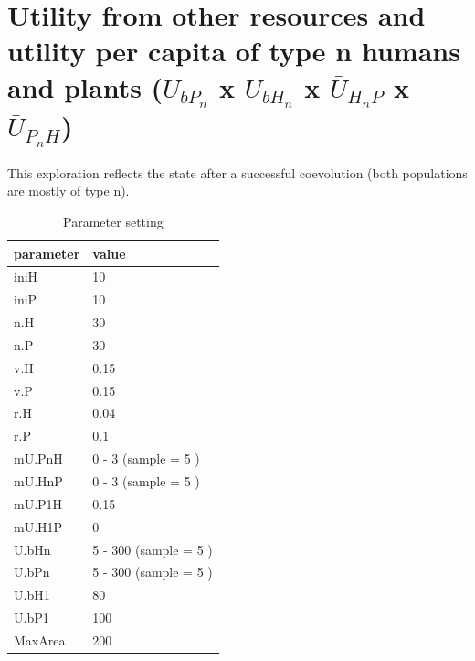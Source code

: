 \documentclass[]{book}
\begin{document}
\newpage

\hypertarget{utility-from-other-resources-and-utility-per-capita-of-type-n-humans-and-plants-u_bp_n-x-u_bh_n-x-baru_h_np-x-baru_p_nh}{%
\section{\texorpdfstring{Utility from other resources and utility per capita of type n humans and plants (\(U_{bP_{n}}\) x \(U_{bH_{n}}\) x \(\bar{U}_{H_{n}P}\) x \(\bar{U}_{P_{n}H}\))}{Utility from other resources and utility per capita of type n humans and plants (U\_\{bP\_\{n\}\} x U\_\{bH\_\{n\}\} x \textbackslash{}bar\{U\}\_\{H\_\{n\}P\} x \textbackslash{}bar\{U\}\_\{P\_\{n\}H\})}}\label{utility-from-other-resources-and-utility-per-capita-of-type-n-humans-and-plants-u_bp_n-x-u_bh_n-x-baru_h_np-x-baru_p_nh}}


This exploration reflects the state after a successful coevolution (both populations are mostly of type n).

\begin{table}[!h]

\caption{\label{tab:4UbnmUntablepdf}Parameter setting}
\centering
\begin{tabular}{l|l}
\hline
parameter & value\\
\hline
iniH & 10\\
\hline
iniP & 10\\
\hline
n.H & 30\\
\hline
n.P & 30\\
\hline
v.H & 0.15\\
\hline
v.P & 0.15\\
\hline
r.H & 0.04\\
\hline
r.P & 0.1\\
\hline
mU.PnH & 0 - 3 (sample = 5 )\\
\hline
mU.HnP & 0 - 3 (sample = 5 )\\
\hline
mU.P1H & 0.15\\
\hline
mU.H1P & 0\\
\hline
U.bHn & 5 - 300 (sample = 5 )\\
\hline
U.bPn & 5 - 300 (sample = 5 )\\
\hline
U.bH1 & 80\\
\hline
U.bP1 & 100\\
\hline
MaxArea & 200\\
\hline
\end{tabular}
\end{table}
\end{document}
